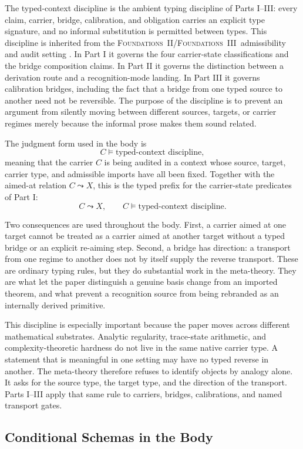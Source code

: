 \documentclass[11pt]{article}
\newcommand{\FTwo}{\textsc{Foundations~II}}
\newcommand{\FThree}{\textsc{Foundations~III}}
\newcommand{\TCD}{typed-context discipline}
\theoremstyle{definition}
\begin{document}
The typed-context discipline is the ambient typing discipline of Parts
I--III: every claim, carrier, bridge, calibration, and obligation
carries an explicit type signature, and no informal substitution is
permitted between types.  This discipline is inherited from the
\FTwo/\FThree\ admissibility and audit setting
\cite{Tsiokos2026FoundationsII,Tsiokos2026FoundationsIII}.  In Part I
it governs the four carrier-state classifications and the bridge
composition claims.  In Part II it governs the distinction between a
derivation route and a recognition-mode landing.  In Part III it
governs calibration bridges, including the fact that a bridge from one
typed source to another need not be reversible.  The purpose of the
discipline is to prevent an argument from silently moving between
different sources, targets, or carrier regimes merely because the
informal prose makes them sound related.

The judgment form used in the body is
\[
  C\models\text{\TCD},
\]
meaning that the carrier \(C\) is being audited in a context whose
source, target, carrier type, and admissible imports have all been fixed.
Together with the aimed-at relation \(C\leadsto X\), this is the typed
prefix for the carrier-state predicates of Part I:
\[
  C\leadsto X,\qquad C\models\text{\TCD}.
\]

Two consequences are used throughout the body.  First, a carrier aimed
at one target cannot be treated as a carrier aimed at another target
without a typed bridge or an explicit re-aiming step.  Second, a
bridge has direction: a transport from one regime to another does not
by itself supply the reverse transport.  These are ordinary typing
rules, but they do substantial work in the meta-theory.  They are what
let the paper distinguish a genuine basis change from an imported
theorem, and what prevent a recognition source from being rebranded as
an internally derived primitive.

This discipline is especially important because the paper moves across
different mathematical substrates.  Analytic regularity, trace-state
arithmetic, and complexity-theoretic hardness do not live in the same
native carrier type.  A statement that is meaningful in one setting may
have no typed reverse in another.  The meta-theory therefore refuses
to identify objects by analogy alone.  It asks for the source type, the
target type, and the direction of the transport.  Parts I--III apply
that same rule to carriers, bridges, calibrations, and named transport
gates.

\subsection{Conditional Schemas in the Body}\label{sec:apparatus:opacity-guards}
\end{document}
